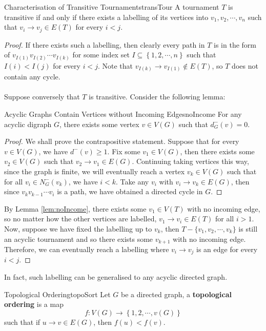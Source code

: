 \documentclass[math]{amznotes}
\theoremstyle{remark}
\newcommand{\0}{\mathbf{0}}
\newcommand{\1}{\mathbf{1}}
\begin{document}
\begin{probox}{Characterisation of Transitive Tournaments}{transTour}
    A tournament $T$ is transitive if and only if there exists a labelling of its vertices into $v_1, v_2, \cdots, v_n$ such that $v_i \to v_j \in E(T)$ for every $i < j$.
    \tcblower
    \begin{proof}
        If there exists such a labelling, then clearly every path in $T$ is in the form of $v_{I(1)}v_{I(2)}\cdots v_{I(k)}$ for some index set $I \subseteq \left\{1, 2, \cdots, n\right\}$ such that $I(i) < I(j)$ for every $i < j$. Note that $v_{I(k)} \to v_{I(1)} \notin E(T)$, so $T$ does not contain any cycle.
        \\\\
        Suppose conversely that $T$ is transitive. Consider the following lemma:
        \begin{lembox}{Acyclic Graphs Contain Vertices without Incoming Edges}{noIncome}
            For any acyclic digraph $G$, there exists some vertex $v \in V(G)$ such that $d^-_G(v) = 0$.
            \tcblower
            \begin{proof}
                We shall prove the contrapositive statement. Suppose that for every $v \in V(G)$, we have $d^-(v) \geq 1$. Fix some $v_1 \in V(G)$, then there exists some $v_2 \in V(G)$ such that $v_2 \to v_1 \in E(G)$. Continuing taking vertices this way, since the graph is finite, we will eventually reach a vertex $v_k \in V(G)$ such that for all $v_i \in N_G^-(v_k)$, we have $i < k$. Take any $v_i$ with $v_i \to v_k \in E(G)$, then since $v_kv_{k - 1}\cdots v_i$ is a path, we have obtained a directed cycle in $G$.
            \end{proof}
        \end{lembox}
        By Lemma \ref{lem:noIncome}, there exists some $v_1 \in V(T)$ with no incoming edge, so no matter how the other vertices are labelled, $v_1 \to v_i \in E(T)$ for all $i > 1$. Now, suppose we have fixed the labelling up to $v_k$, then $T - \{v_1, v_2, \cdots, v_k\}$ is still an acyclic tournament and so there exists some $v_{k + 1}$ with no incoming edge. Therefore, we can eventually reach a labelling where $v_i \to v_j$ is an edge for every $i < j$.
    \end{proof}
\end{probox}
In fact, such labelling can be generalised to any acyclic directed graph.
\begin{dfnbox}{Topological Ordering}{topoSort}
    Let $G$ be a directed graph, a {\color{red} \textbf{topological ordering}} is a map 
    \begin{equation*}
        f \colon V(G) \to \left\{1, 2, \cdots, v(G)\right\}
    \end{equation*}
    such that if $u \to v \in E(G)$, then $f(u) < f(v)$.
\end{dfnbox}
\end{document}

